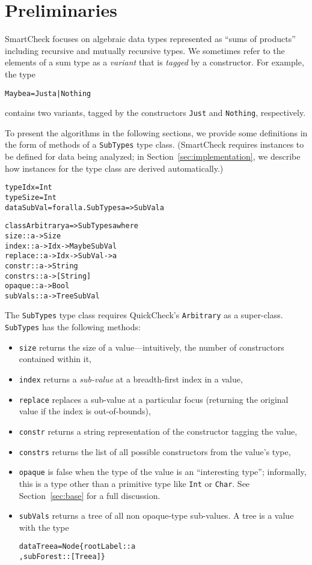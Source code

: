 \documentclass{sigplanconf}
\newenvironment{code}{\begin{alltt}\footnotesize}{\end{alltt}}
\newcommand{\ttp}[1]{\texttt{#1}}
\begin{document}
\section{Preliminaries}\label{sec:preliminaries}

SmartCheck focuses on algebraic data types represented as ``sums of products''
including recursive and mutually recursive types.  We sometimes refer to the
elements of a sum type as a \emph{variant} that is \emph{tagged} by a
constructor.  For example, the type
%
\begin{code}
Maybe a = Just a | Nothing
\end{code}
%
\noindent
contains two variants, tagged by the constructors \ttp{Just} and \ttp{Nothing},
respectively.

To present the algorithms in the following sections, we provide some definitions
in the form of methods of a \ttp{SubTypes} type class.  (SmartCheck requires
instances to be defined for data being analyzed; in
Section~\ref{sec:implementation}, we describe how instances for the type class
are derived automatically.)
%
\begin{code}
type Idx    = Int
type Size   = Int
data SubVal = forall a. SubTypes a => SubVal a

class Arbitrary a => SubTypes a where
  size    :: a -> Size
  index   :: a -> Idx -> Maybe SubVal
  replace :: a -> Idx -> SubVal -> a
  constr  :: a -> String
  constrs :: a -> [String]
  opaque  :: a -> Bool
  subVals :: a -> Tree SubVal
\end{code}
%
\noindent
The \ttp{SubTypes} type class requires QuickCheck's \ttp{Arbitrary} as a
super-class.  \ttp{SubTypes} has the following methods:
\begin{itemize}
\item \ttp{size} returns the size of a value---intuitively, the number of
  constructors contained within it,
\item \ttp{index} returns a \emph{sub-value} at a breadth-first index in a
  value,
\item \ttp{replace} replaces a sub-value at a particular focus (returning the
  original value if the index is out-of-bounds),
\item \ttp{constr} returns a string representation of the constructor tagging
  the value,
\item \ttp{constrs} returns the list of all possible constructors from the
  value's type,
\item \ttp{opaque} is false when the type of the value is an ``interesting
  type''; informally, this is a type other than a primitive type like \ttp{Int}
  or \ttp{Char}.  See Section~\ref{sec:base} for a full discussion.
\item \ttp{subVals} returns a tree of all non opaque-type sub-values.  A tree is a
  value with the type
%
  \begin{code}
data Tree a = Node \{ rootLabel :: a
                   , subForest :: [Tree a] \}
  \end{code}
%
\end{itemize}
\end{document}
